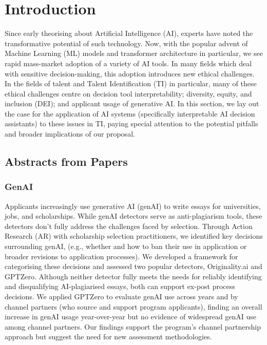 

\chapter{\label{ch:intro}Introduction} 

\minitoc


Since early theorising about Artificial Intelligence (AI), experts have noted the transformative potential of such technology. Now, with the popular advent of Machine Learning (ML) models and transformer architecture in particular, we see rapid mass-market adoption of a variety of AI tools. In many fields which deal with sensitive decision-making, this adoption introduces new ethical challenges. In the fields of talent and Talent Identification (TI) in particular, many of these ethical challenges centre on decision tool interpretability; diversity, equity, and inclusion (DEI); and applicant usage of generative AI. In this section, we lay out the case for the application of AI systems (specifically interpretable AI decision assistants) to these issues in TI, paying special attention to the potential pitfalls and broader implications of our proposal.

\section{Abstracts from Papers} %

\subsection{GenAI}
Applicants increasingly use generative AI (genAI) to write essays for universities, jobs, and scholarships. While genAI detectors serve as anti-plagiarism tools, these detectors don’t fully address the challenges faced by selection. Through Action Research (AR) with scholarship selection practitioners, we identified key decisions surrounding genAI, (e.g., whether and how to ban their use in application or broader revisions to application processes). We developed a framework for categorising these decisions and assessed two popular detectors, Originality.ai and GPTZero. Although neither detector fully meets the needs for reliably identifying and disqualifying AI-plagiarised essays, both can support ex-post process decisions. We applied GPTZero to evaluate genAI use across years and by channel partners (who source and support program applicants), finding an overall increase in genAI usage year-over-year but no evidence of widespread genAI use among channel partners. Our findings support the program’s channel partnership approach but suggest the need for new assessment methodologies.

